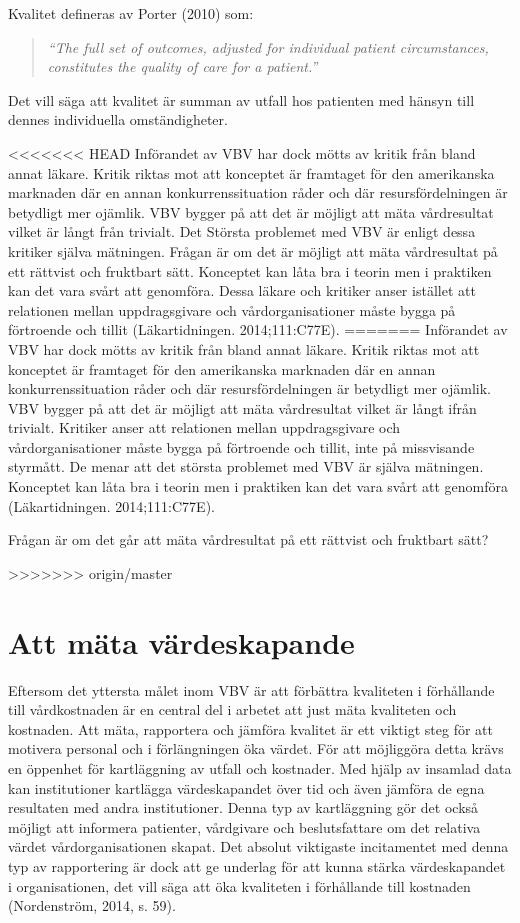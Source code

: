 Kvalitet defineras av Porter (2010) som:
\begin{quotation}
\textit{``The full set of outcomes, adjusted for individual patient circumstances, constitutes the quality of care for a patient.''}
\end{quotation}
Det vill säga att kvalitet är summan av utfall hos patienten med hänsyn till dennes individuella omständigheter.

<<<<<<< HEAD
Införandet av VBV har dock mötts av kritik från bland annat läkare. Kritik riktas mot att konceptet är framtaget för den amerikanska marknaden där en annan konkurrenssituation råder och där resursfördelningen är betydligt mer ojämlik. VBV bygger på att det är möjligt att mäta vårdresultat vilket är långt från trivialt. Det Största problemet med VBV är enligt dessa kritiker själva mätningen. Frågan är om det är möjligt att mäta vårdresultat på ett rättvist och fruktbart sätt. Konceptet kan låta bra i teorin men i praktiken kan det vara svårt att genomföra. Dessa läkare och kritiker anser istället att relationen mellan uppdragsgivare och vårdorganisationer måste bygga på förtroende och tillit (Läkartidningen. 2014;111:C77E). 
=======
Införandet av VBV har dock mötts av kritik från bland annat läkare. Kritik
riktas mot att konceptet är framtaget för den amerikanska marknaden där en annan
konkurrenssituation råder och där resursfördelningen är betydligt mer ojämlik. VBV bygger på att det är möjligt att mäta vårdresultat vilket är långt ifrån trivialt. Kritiker anser att relationen mellan uppdragsgivare och vårdorganisationer måste bygga på förtroende och tillit, inte på missvisande styrmått. De menar att det största problemet med VBV är själva mätningen. Konceptet kan låta bra i teorin men i praktiken kan det vara svårt att genomföra (Läkartidningen. 2014;111:C77E). 

Frågan är om det går att mäta vårdresultat på ett rättvist och fruktbart sätt?



>>>>>>> origin/master

\section{Att mäta värdeskapande}

Eftersom det yttersta målet inom VBV är att förbättra kvaliteten i förhållande till vårdkostnaden är en central del i arbetet att just mäta kvaliteten och kostnaden. Att mäta, rapportera och jämföra kvalitet är ett viktigt steg för att motivera personal och i förlängningen öka värdet. För att möjliggöra detta krävs en öppenhet för kartläggning av utfall och kostnader. Med hjälp av insamlad data kan institutioner kartlägga värdeskapandet över tid och även jämföra de egna resultaten med andra institutioner. Denna typ av kartläggning gör det också möjligt att informera patienter, vårdgivare och beslutsfattare om det relativa värdet vårdorganisationen skapat. Det absolut viktigaste incitamentet med denna typ av rapportering är dock att ge underlag för att kunna stärka värdeskapandet i organisationen, det vill säga att öka kvaliteten i förhållande till kostnaden (Nordenström, 2014, s. 59).


